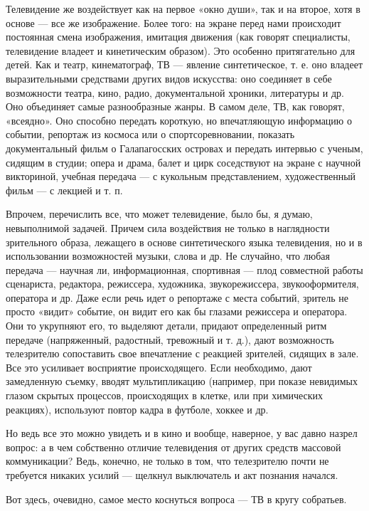 \documentclass[12pt, a4paper, openany]{book}
\begin{document}
Телевидение же воздействует как на первое «окно души», так и на второе, хотя в основе — все же изображение. Более того: на экране перед нами происходит постоянная смена изображения, имитация движения (как говорят специалисты, телевидение владеет и кинетическим образом). Это особенно притягательно для детей. Как и театр, кинематограф, ТВ — явление синтетическое, т. е. оно владеет выразительными средствами других видов искусства: оно соединяет в себе возможности театра, кино, радио, документальной хроники, литературы и др. Оно объединяет самые разнообразные жанры. В самом деле, ТВ, как говорят, «всеядно». Оно способно передать короткую, но впечатляющую информацию о событии, репортаж из космоса или о спортсоревновании, показать документальный фильм о Галапагосских островах и передать интервью с ученым, сидящим в студии; опера и драма, балет и цирк соседствуют на экране с научной викториной, учебная передача — с кукольным представлением, художественный фильм — с лекцией и т. п. 


Впрочем, перечислить все, что может телевидение, было бы, я думаю, невыполнимой задачей. Причем сила воздействия не только в наглядности зрительного образа, лежащего в основе синтетического языка телевидения, но и в использовании возможностей музыки, слова и др. Не случайно, что любая передача — научная ли, информационная, спортивная — плод совместной работы сценариста, редактора, режиссера, художника, звукорежиссера, звукооформителя, оператора и др. Даже если речь идет о репортаже с места событий, зритель не просто «видит» событие, он видит его как бы глазами режиссера и оператора. Они то укрупняют его, то выделяют детали, придают определенный ритм передаче (напряженный, радостный, тревожный и т. д.), дают возможность телезрителю сопоставить свое впечатление с реакцией зрителей, сидящих в зале. Все это усиливает восприятие происходящего. Если необходимо, дают замедленную съемку, вводят мультипликацию (например, при показе невидимых глазом скрытых процессов, происходящих в клетке, или при химических реакциях), используют повтор кадра в футболе, хоккее и др. 

Но ведь все это можно увидеть и в кино и вообще, наверное, у вас давно назрел вопрос: а в чем собственно отличие телевидения от других средств массовой коммуникации? Ведь, конечно, не только в том, что телезрителю почти не требуется никаких усилий — щелкнул выключатель и акт познания начался. 

Вот здесь, очевидно, самое место коснуться вопроса — ТВ в кругу собратьев. 
\end{document}
